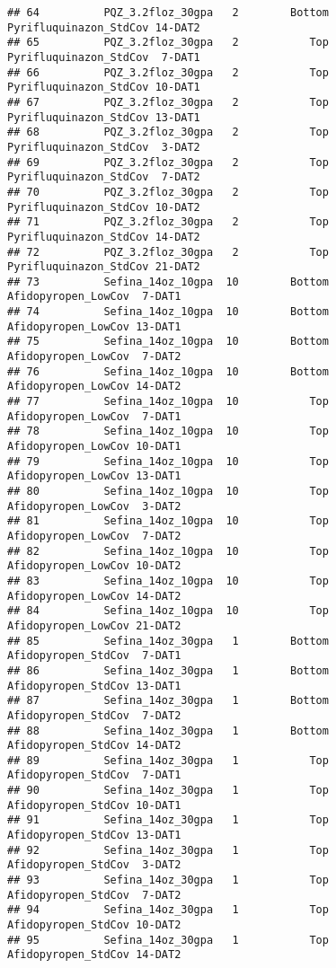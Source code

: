 \documentclass[
]{article}
\begin{document}
\begin{verbatim}
## 64          PQZ_3.2floz_30gpa   2        Bottom Pyrifluquinazon_StdCov 14-DAT2
## 65          PQZ_3.2floz_30gpa   2           Top Pyrifluquinazon_StdCov  7-DAT1
## 66          PQZ_3.2floz_30gpa   2           Top Pyrifluquinazon_StdCov 10-DAT1
## 67          PQZ_3.2floz_30gpa   2           Top Pyrifluquinazon_StdCov 13-DAT1
## 68          PQZ_3.2floz_30gpa   2           Top Pyrifluquinazon_StdCov  3-DAT2
## 69          PQZ_3.2floz_30gpa   2           Top Pyrifluquinazon_StdCov  7-DAT2
## 70          PQZ_3.2floz_30gpa   2           Top Pyrifluquinazon_StdCov 10-DAT2
## 71          PQZ_3.2floz_30gpa   2           Top Pyrifluquinazon_StdCov 14-DAT2
## 72          PQZ_3.2floz_30gpa   2           Top Pyrifluquinazon_StdCov 21-DAT2
## 73          Sefina_14oz_10gpa  10        Bottom    Afidopyropen_LowCov  7-DAT1
## 74          Sefina_14oz_10gpa  10        Bottom    Afidopyropen_LowCov 13-DAT1
## 75          Sefina_14oz_10gpa  10        Bottom    Afidopyropen_LowCov  7-DAT2
## 76          Sefina_14oz_10gpa  10        Bottom    Afidopyropen_LowCov 14-DAT2
## 77          Sefina_14oz_10gpa  10           Top    Afidopyropen_LowCov  7-DAT1
## 78          Sefina_14oz_10gpa  10           Top    Afidopyropen_LowCov 10-DAT1
## 79          Sefina_14oz_10gpa  10           Top    Afidopyropen_LowCov 13-DAT1
## 80          Sefina_14oz_10gpa  10           Top    Afidopyropen_LowCov  3-DAT2
## 81          Sefina_14oz_10gpa  10           Top    Afidopyropen_LowCov  7-DAT2
## 82          Sefina_14oz_10gpa  10           Top    Afidopyropen_LowCov 10-DAT2
## 83          Sefina_14oz_10gpa  10           Top    Afidopyropen_LowCov 14-DAT2
## 84          Sefina_14oz_10gpa  10           Top    Afidopyropen_LowCov 21-DAT2
## 85          Sefina_14oz_30gpa   1        Bottom    Afidopyropen_StdCov  7-DAT1
## 86          Sefina_14oz_30gpa   1        Bottom    Afidopyropen_StdCov 13-DAT1
## 87          Sefina_14oz_30gpa   1        Bottom    Afidopyropen_StdCov  7-DAT2
## 88          Sefina_14oz_30gpa   1        Bottom    Afidopyropen_StdCov 14-DAT2
## 89          Sefina_14oz_30gpa   1           Top    Afidopyropen_StdCov  7-DAT1
## 90          Sefina_14oz_30gpa   1           Top    Afidopyropen_StdCov 10-DAT1
## 91          Sefina_14oz_30gpa   1           Top    Afidopyropen_StdCov 13-DAT1
## 92          Sefina_14oz_30gpa   1           Top    Afidopyropen_StdCov  3-DAT2
## 93          Sefina_14oz_30gpa   1           Top    Afidopyropen_StdCov  7-DAT2
## 94          Sefina_14oz_30gpa   1           Top    Afidopyropen_StdCov 10-DAT2
## 95          Sefina_14oz_30gpa   1           Top    Afidopyropen_StdCov 14-DAT2

\end{verbatim}
\end{document}
